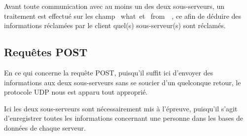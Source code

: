 \documentclass[a4paper,11pt,french]{article}
\begin{document}
 Avant toute communication avec au moins un des deux sous-serveurs, un
 traitement est effectué sur les champ \og~what~\fg et \og~from~\fg~, ce afin de déduire
 des informations réclamées par le client quel(s) sous-serveur(s) sont réclamés.
 
  \subsection{Requêtes POST}
  En ce qui concerne la requête POST, puisqu'il suffit ici d'envoyer des
  informations aux deux sous-serveurs sans se soucier d'un quelconque retour, le
  protocole UDP nous est apparu tout approprié.
  
  Ici les deux sous-serveurs sont nécessairement mis à l'épreuve, puisqu'il
  s'agit d'enregistrer toutes les informations concernant une personne dans les
  bases de données de chaque serveur.
\end{document}
